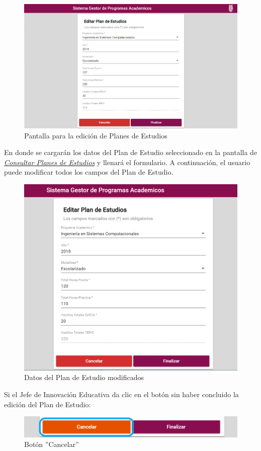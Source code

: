 \begin{figure}[!hbtp]
	\centering
	\hypertarget{editarPE}{\includegraphics[width=0.7\linewidth]{images/SP4-GPE/editarPE}}
	\caption{Pantalla para la edición de Planes de Estudios}
	\label{editarPE}
\end{figure}

En donde se cargarán los datos del Plan de Estudio seleccionado en la pantalla de \hyperlink{consultarPE}{\textit{Consultar Planes de Estudios}} y llenará el formulario.
\newpage
A continuación, el usuario puede modificar todos los campos del Plan de Estudio.
\begin{figure}[!hbtp]
	\centering
	\hypertarget{modif}{\includegraphics[width=0.7\linewidth]{images/SP4-GPE/editarPE1}}
	\caption{Datos del Plan de Estudio modificados}
	\label{modif}
\end{figure}

 Si el Jefe de Innovación Educativa da clic en el botón  sin haber concluido la edición del Plan de Estudio:

\begin{figure}[!hbtp]
	\centering
	\hypertarget{cancel2}{\includegraphics[width=0.7\linewidth]{images/SP4-GPE/cancelarPE}}
	\caption{Botón ''Cancelar''}
	\label{cancel2}
\end{figure}
\newpage

